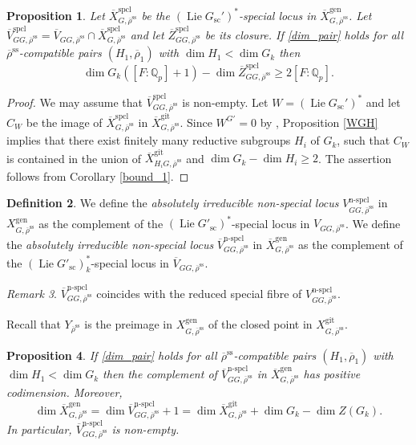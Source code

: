 \documentclass{amsart}
\newtheorem{prop}{Proposition}[section]
\theoremstyle{definition}
\newtheorem{defi}[prop]{Definition}
\theoremstyle{remark}
\newtheorem{remar}[prop]{Remark}
\newcommand{\Qp}{\mathbb {Q}_p}
\newcommand{\Zbar}{\overline{Z}}
\newcommand{\Vbar}{\overline{{V}}}
\newcommand{\rhobar}{\overline{\rho}}
\newcommand{\gen}{\mathrm{gen}}
\newcommand{\gps}{\mathrm{git}}
\newcommand{\Xbar}{\overline{X}}
\DeclareMathOperator{\spcl}{spcl}
\DeclareMathOperator{\nspcl}{n-spcl}
\DeclareMathOperator{\Lie}{Lie}
\newcommand{\rhobarss}{\rhobar^{\mathrm{ss}}}
\newcommand{\git}{\mathrm{git}}
\newcommand{\sic}{\operatorname{sc}}
\begin{document}
\begin{prop}\label{bound_special} Let $\Xbar^{\spcl}_{G,\rhobarss}$ be the $(\Lie G_{\sic}')^*$-special locus in $\Xbar^{\gen}_{G, \rhobarss}$. 
Let $\Vbar^{\spcl}_{GG, \rhobarss}=\Vbar_{GG, \rhobarss}\cap \Xbar^{\spcl}_{G,\rhobarss}$  and let 
 $\Zbar^{\spcl}_{GG, \rhobarss}$ be its closure. If \eqref{dim_pair} holds for all $\rhobarss$-compatible pairs $(H_1, \rhobar_1)$ with $\dim H_1< \dim G_k$ then
\begin{equation}\label{eq_spcl}
\dim G_k ([F:\Qp]+1) - \dim \Zbar_{GG, \rhobarss}^{\spcl} \ge 2 [F:\Qp]. 
\end{equation}
\end{prop} 

\begin{proof} We may assume that $\Vbar^{\spcl}_{GG, \rhobarss}$ is non-empty. Let $W=(\Lie G_{\sic}')^*$ and let $C_{W}$ be the image of $\Xbar^{\spcl}_{G,\rhobarss}$ in $\Xbar^{\gps}_{G,\rhobarss}$. 
Since $W^{G'}=0$ by , Proposition \ref{WGH} implies that 
there exist finitely many reductive subgroups $H_i$ of $G_k$, such that 
$C_W$ is contained in the union of $\Xbar^{\gps}_{H_iG, \rhobarss}$ and 
$\dim G_k - \dim H_i\ge 2$. The assertion follows from Corollary \ref{bound_1}.
\end{proof}

\begin{defi}\label{defi_Vnspcl} We define the \emph{absolutely irreducible non-special locus} $V^{\nspcl}_{GG, \rhobarss}$ 
in $X^{\gen}_{G, \rhobarss}$ as the complement of the $(\Lie G'_{\sic})^*$-special locus in $V_{GG, \rhobarss}$. We 
define the \emph{absolutely irreducible non-special locus} $\Vbar^{\nspcl}_{GG, \rhobarss}$ 
in $\Xbar^{\gen}_{G, \rhobarss}$ as the complement of the $(\Lie G'_{\sic})_k^*$-special locus in $\Vbar_{GG, \rhobarss}$.
\end{defi}

\begin{remar} $\Vbar^{\nspcl}_{GG, \rhobarss}$ coincides 
with the reduced special fibre of $V^{\nspcl}_{GG, \rhobarss}$.
\end{remar}

Recall that $Y_{\rhobarss}$ is the preimage in $X^{\gen}_{G, \rhobarss}$ of the 
closed point in $X^{\gps}_{G, \rhobarss}$. 




\begin{prop}\label{cpnhg} If \eqref{dim_pair} holds for all $\rhobarss$-compatible pairs $(H_1, \rhobar_1)$ with $\dim H_1< \dim G_k$ then 
the complement of $\Vbar^{\nspcl}_{GG, \rhobarss}$  in $\Xbar^{\gen}_{G, \rhobarss}$ 
 has positive codimension. Moreover, 
 \begin{equation}\label{fixing_eq}
 \dim \Xbar^{\gen}_{G,\rhobarss}= \dim \Vbar^{\nspcl}_{GG, \rhobarss}+1= \dim \Xbar^{\git}_{G, \rhobarss} + \dim G_k -\dim Z(G_k).
 \end{equation}
 In particular, $\Vbar^{\nspcl}_{GG, \rhobarss}$  is non-empty.
\end{prop} 
\end{document}
